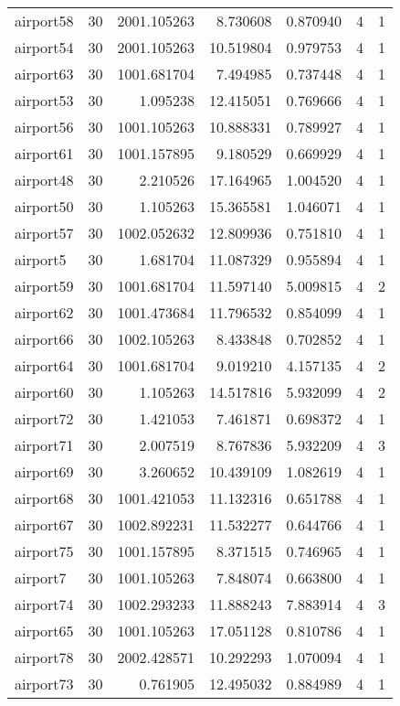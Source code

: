 \begin{longtable}{|l|r|r|r|r|r|r|}
airport58 & 30 & 2001.105263 & 8.730608 & 0.870940 & 4 & 1 \\
airport54 & 30 & 2001.105263 & 10.519804 & 0.979753 & 4 & 1 \\
airport63 & 30 & 1001.681704 & 7.494985 & 0.737448 & 4 & 1 \\
airport53 & 30 & 1.095238 & 12.415051 & 0.769666 & 4 & 1 \\
airport56 & 30 & 1001.105263 & 10.888331 & 0.789927 & 4 & 1 \\
airport61 & 30 & 1001.157895 & 9.180529 & 0.669929 & 4 & 1 \\
airport48 & 30 & 2.210526 & 17.164965 & 1.004520 & 4 & 1 \\
airport50 & 30 & 1.105263 & 15.365581 & 1.046071 & 4 & 1 \\
airport57 & 30 & 1002.052632 & 12.809936 & 0.751810 & 4 & 1 \\
airport5 & 30 & 1.681704 & 11.087329 & 0.955894 & 4 & 1 \\
airport59 & 30 & 1001.681704 & 11.597140 & 5.009815 & 4 & 2 \\
airport62 & 30 & 1001.473684 & 11.796532 & 0.854099 & 4 & 1 \\
airport66 & 30 & 1002.105263 & 8.433848 & 0.702852 & 4 & 1 \\
airport64 & 30 & 1001.681704 & 9.019210 & 4.157135 & 4 & 2 \\
airport60 & 30 & 1.105263 & 14.517816 & 5.932099 & 4 & 2 \\
airport72 & 30 & 1.421053 & 7.461871 & 0.698372 & 4 & 1 \\
airport71 & 30 & 2.007519 & 8.767836 & 5.932209 & 4 & 3 \\
airport69 & 30 & 3.260652 & 10.439109 & 1.082619 & 4 & 1 \\
airport68 & 30 & 1001.421053 & 11.132316 & 0.651788 & 4 & 1 \\
airport67 & 30 & 1002.892231 & 11.532277 & 0.644766 & 4 & 1 \\
airport75 & 30 & 1001.157895 & 8.371515 & 0.746965 & 4 & 1 \\
airport7 & 30 & 1001.105263 & 7.848074 & 0.663800 & 4 & 1 \\
airport74 & 30 & 1002.293233 & 11.888243 & 7.883914 & 4 & 3 \\
airport65 & 30 & 1001.105263 & 17.051128 & 0.810786 & 4 & 1 \\
airport78 & 30 & 2002.428571 & 10.292293 & 1.070094 & 4 & 1 \\
airport73 & 30 & 0.761905 & 12.495032 & 0.884989 & 4 & 1 \\

\end{longtable}
